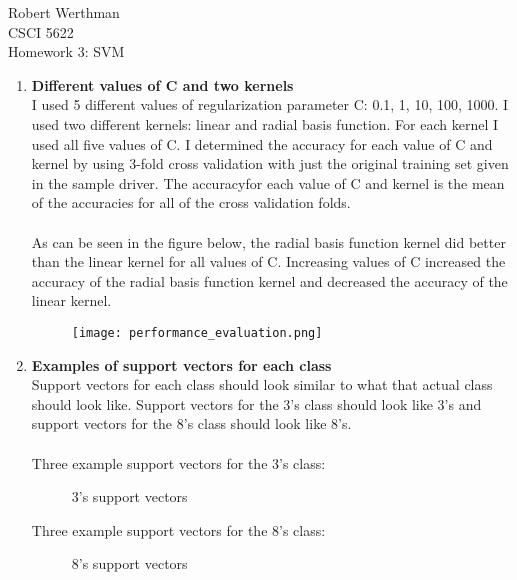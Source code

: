 \documentclass[10pt]{article}
\begin{document}
\noindent
Robert Werthman\\
CSCI 5622\\
Homework 3: SVM\\

\begin{enumerate}
  \item\textbf{Different values of C and two kernels}\\
  I used 5 different values of regularization parameter C: 0.1, 1, 10, 100,
  1000.  I used two different kernels: linear and  radial basis function.  For
  each kernel I used all five values of C. I determined
  the accuracy for each value of C and kernel by using 3-fold cross validation
  with just the original training set given in the sample driver.  
  The accuracyfor each value of C and kernel is the mean of the accuracies for 
  all of the cross validation folds.\\
  \\ 
  As can be seen in the figure below, the radial basis function kernel did
  better than the linear kernel for all values of C.  Increasing values of C
  increased the accuracy of the radial basis function kernel and decreased
  the accuracy of the linear kernel. 
  \begin{figure}[H]
    \centering
    \texttt{[image: performance\_evaluation.png]}
    \end{figure}
  \item \textbf{Examples of support vectors for each class}\\
  Support vectors for each class should look similar to what that actual class
  should look like.  Support vectors for the 3's class should look like 3's and support
  vectors for the 8's class should look like 8's.\\
  \\
  Three example support vectors for the 3's class: 
  \begin{figure}[H]
    \centering
     \caption{3's support vectors}
    \end{figure}
    Three example support vectors for the 8's class:
    \begin{figure}[H]
    \centering
     \caption{8's support vectors}
    \end{figure}
\end{enumerate}
\end{document}
